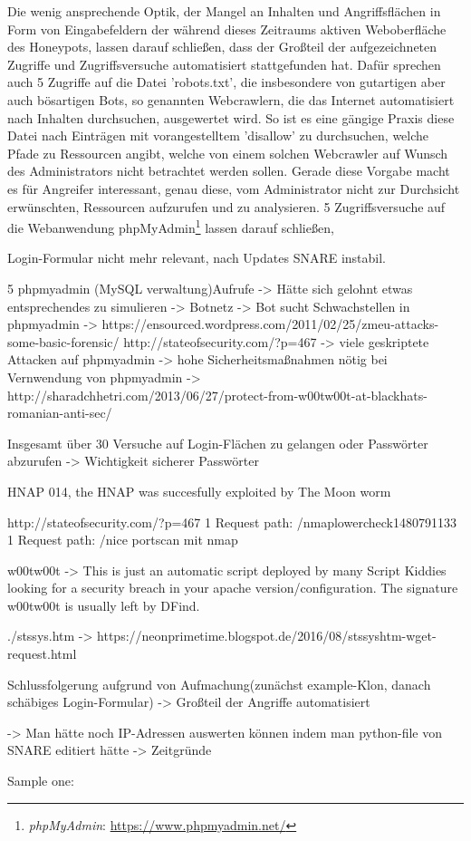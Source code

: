 Die wenig ansprechende Optik, der Mangel an Inhalten und Angriffsflächen in Form von Eingabefeldern der während dieses Zeitraums aktiven Weboberfläche des Honeypots, lassen darauf schließen, dass der Großteil der aufgezeichneten Zugriffe und Zugriffsversuche automatisiert stattgefunden hat. Dafür sprechen auch 5 Zugriffe auf die Datei 'robots.txt', die insbesondere von gutartigen aber auch bösartigen Bots, so genannten Webcrawlern, die das Internet automatisiert nach Inhalten durchsuchen, ausgewertet wird. So ist es eine gängige Praxis diese Datei nach Einträgen mit vorangestelltem 'disallow' zu durchsuchen, welche Pfade zu Ressourcen angibt, welche von einem solchen Webcrawler auf Wunsch des Administrators nicht betrachtet werden sollen. Gerade diese Vorgabe macht es für Angreifer interessant, genau diese, vom Administrator nicht zur Durchsicht erwünschten, Ressourcen aufzurufen und zu analysieren. 5 Zugriffsversuche auf die Webanwendung phpMyAdmin\footnote{ \textit{phpMyAdmin}: \url{https://www.phpmyadmin.net/}} lassen darauf schließen, 


Login-Formular nicht mehr relevant, nach Updates SNARE instabil.


5 phpmyadmin (MySQL verwaltung)Aufrufe -> Hätte sich gelohnt etwas entsprechendes zu simulieren
-> Botnetz
-> Bot sucht Schwachstellen in phpmyadmin -> https://ensourced.wordpress.com/2011/02/25/zmeu-attacks-some-basic-forensic/
http://stateofsecurity.com/?p=467
-> viele geskriptete Attacken auf phpmyadmin -> hohe Sicherheitsmaßnahmen nötig bei Vernwendung von phpmyadmin
-> http://sharadchhetri.com/2013/06/27/protect-from-w00tw00t-at-blackhats-romanian-anti-sec/

Insgesamt über 30 Versuche auf Login-Flächen zu gelangen oder Passwörter abzurufen -> Wichtigkeit sicherer Passwörter

HNAP  014, the HNAP was succesfully exploited by The Moon worm

http://stateofsecurity.com/?p=467 
   1 Request path: /nmaplowercheck1480791133
   1 Request path: /nice%
   portscan mit nmap

w00tw00t -> This is just an automatic script deployed by many Script Kiddies looking for a security breach in your apache version/configuration. The signature w00tw00t is usually left by DFind.

./stssys.htm -> https://neonprimetime.blogspot.de/2016/08/stssyshtm-wget-request.html

Schlussfolgerung aufgrund von Aufmachung(zunächst example-Klon, danach schäbiges Login-Formular) -> Großteil der Angriffe automatisiert

-> Man hätte noch IP-Adressen auswerten können indem man python-file von SNARE editiert hätte -> Zeitgründe


Sample one:
